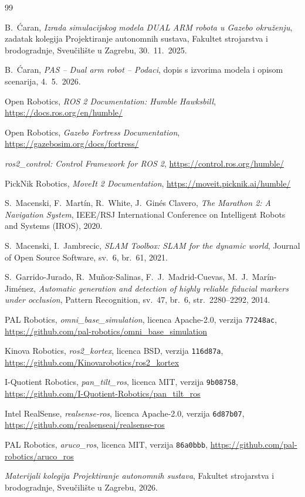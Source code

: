 \documentclass[12pt,a4paper]{article}
\begin{document}
\newpage
\begin{thebibliography}{99}

B.~Ćaran, \textit{Izrada simulacijskog modela DUAL ARM robota u Gazebo okruženju},
zadatak kolegija Projektiranje autonomnih sustava, Fakultet strojarstva i brodogradnje,
Sveučilište u Zagrebu, 30.~11.~2025.

B.~Ćaran, \textit{PAS -- Dual arm robot -- Podaci}, dopis s izvorima modela i opisom
scenarija, 4.~5.~2026.

Open Robotics, \textit{ROS 2 Documentation: Humble Hawksbill},
\url{https://docs.ros.org/en/humble/}

Open Robotics, \textit{Gazebo Fortress Documentation},
\url{https://gazebosim.org/docs/fortress/}

\textit{ros2\_control: Control Framework for ROS 2},
\url{https://control.ros.org/humble/}

PickNik Robotics, \textit{MoveIt 2 Documentation},
\url{https://moveit.picknik.ai/humble/}

S.~Macenski, F.~Martín, R.~White, J.~Ginés Clavero, \textit{The Marathon 2: A Navigation System},
IEEE/RSJ International Conference on Intelligent Robots and Systems (IROS), 2020.

S.~Macenski, I.~Jambrecic, \textit{SLAM Toolbox: SLAM for the dynamic world},
Journal of Open Source Software, sv.~6, br.~61, 2021.

S.~Garrido-Jurado, R.~Muñoz-Salinas, F.~J.~Madrid-Cuevas, M.~J.~Marín-Jiménez,
\textit{Automatic generation and detection of highly reliable fiducial markers under occlusion},
Pattern Recognition, sv.~47, br.~6, str.~2280--2292, 2014.

PAL Robotics, \textit{omni\_base\_simulation}, licenca Apache-2.0, verzija \texttt{77248ac},
\url{https://github.com/pal-robotics/omni\_base\_simulation}

Kinova Robotics, \textit{ros2\_kortex}, licenca BSD, verzija \texttt{116d87a},
\url{https://github.com/Kinovarobotics/ros2\_kortex}

I-Quotient Robotics, \textit{pan\_tilt\_ros}, licenca MIT, verzija \texttt{9b08758},
\url{https://github.com/I-Quotient-Robotics/pan\_tilt\_ros}

Intel RealSense, \textit{realsense-ros}, licenca Apache-2.0, verzija \texttt{6d87b07},
\url{https://github.com/realsenseai/realsense-ros}

PAL Robotics, \textit{aruco\_ros}, licenca MIT, verzija \texttt{86a0bbb},
\url{https://github.com/pal-robotics/aruco\_ros}

\textit{Materijali kolegija Projektiranje autonomnih sustava}, Fakultet strojarstva i
brodogradnje, Sveučilište u Zagrebu, 2026.

\end{thebibliography}
\end{document}
